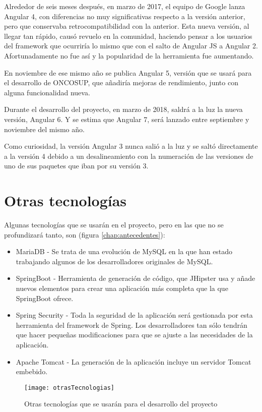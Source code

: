 Alrededor de seis meses después, en marzo de 2017, el equipo de Google lanza Angular 4, con diferencias no muy significativas respecto a la versión anterior, pero que conservaba retrocompatibilidad con la anterior. Esta nueva versión, al llegar tan rápido, causó revuelo en la comunidad, haciendo pensar a los usuarios del framework que ocurriría lo mismo que con el salto de Angular JS a Angular 2. Afortunadamente no fue así y la popularidad de la herramienta fue aumentando.

En noviembre de ese mismo año se publica Angular 5, versión que se usará para el desarrollo de ONCOSUP, que añadiría mejoras de rendimiento, junto con alguna funcionalidad nueva.

Durante el desarrollo del proyecto, en marzo de 2018, saldrá a la luz la nueva versión, Angular 6. Y se estima que Angular 7, será lanzado entre septiembre y noviembre del mismo año.

Como curiosidad, la versión Angular 3 nunca salió a la luz y se saltó directamente a la versión 4 debido a un desalineamiento con la numeración de las versiones de uno de sus paquetes que iban por su versión 3.



\section{Otras tecnologías}
\label{sec:otrasTec}

Algunas tecnologías que se usarán en el proyecto, pero en las que no se profundizará tanto, son (figura \ref{chap:antecedentes}):

\begin{itemize}
\item MariaDB \cite{mariaDB} - Se trata de una evolución de MySQL en la que han estado trabajando algunos de los desarrolladores originales de MySQL.
\item SpringBoot \cite{springBoot} - Herramienta de generación de código, que JHipster usa y añade nuevos elementos para crear una aplicación más completa que la que SpringBoot ofrece.
\item Spring Security \cite{springSec} - Toda la seguridad de la aplicación será gestionada por esta herramienta del framework de Spring. Los desarrolladores tan sólo tendrán que hacer pequeñas modificaciones para que se ajuste a las necesidades de la aplicación.
\item Apache Tomcat \cite{tomcat} - La generación de la aplicación incluye un servidor Tomcat embebido. 

\end{itemize}

\begin{figure}[!h]
\begin{center}
\texttt{[image: otrasTecnologias]}
\caption{Otras tecnologías que se usarán para el desarrollo del proyecto}
\label{fig:otrasTecnologias}
\end{center}
\end{figure}

